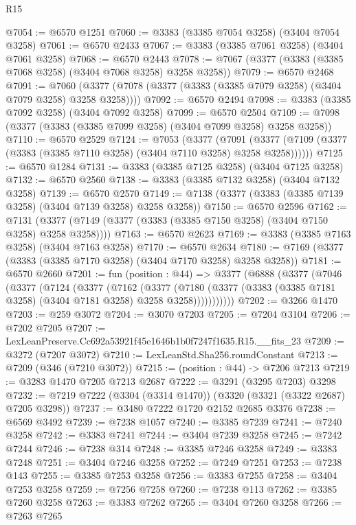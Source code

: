 \begin{lexlean}{R15}
\begin{coremodule}
@7054 := @6570 @1251
@7060 := @3383 (@3385 @7054 @3258) (@3404 @7054 @3258)
@7061 := @6570 @2433
@7067 := @3383 (@3385 @7061 @3258) (@3404 @7061 @3258)
@7068 := @6570 @2443
@7078 := @7067 (@3377 (@3383 (@3385 @7068 @3258) (@3404 @7068 @3258) @3258 @3258))
@7079 := @6570 @2468
@7091 := @7060 (@3377 (@7078 (@3377 (@3383 (@3385 @7079 @3258) (@3404 @7079 @3258) @3258 @3258))))
@7092 := @6570 @2494
@7098 := @3383 (@3385 @7092 @3258) (@3404 @7092 @3258)
@7099 := @6570 @2504
@7109 := @7098 (@3377 (@3383 (@3385 @7099 @3258) (@3404 @7099 @3258) @3258 @3258))
@7110 := @6570 @2529
@7124 := @7053
    (@3377
      (@7091 (@3377 (@7109 (@3377 (@3383 (@3385 @7110 @3258) (@3404 @7110 @3258) @3258 @3258))))))
@7125 := @6570 @1284
@7131 := @3383 (@3385 @7125 @3258) (@3404 @7125 @3258)
@7132 := @6570 @2560
@7138 := @3383 (@3385 @7132 @3258) (@3404 @7132 @3258)
@7139 := @6570 @2570
@7149 := @7138 (@3377 (@3383 (@3385 @7139 @3258) (@3404 @7139 @3258) @3258 @3258))
@7150 := @6570 @2596
@7162 := @7131 (@3377 (@7149 (@3377 (@3383 (@3385 @7150 @3258) (@3404 @7150 @3258) @3258 @3258))))
@7163 := @6570 @2623
@7169 := @3383 (@3385 @7163 @3258) (@3404 @7163 @3258)
@7170 := @6570 @2634
@7180 := @7169 (@3377 (@3383 (@3385 @7170 @3258) (@3404 @7170 @3258) @3258 @3258))
@7181 := @6570 @2660
@7201 := fun (position : @44) =>
  @3377
    (@6888
      (@3377
        (@7046
          (@3377
            (@7124
              (@3377
                (@7162
                  (@3377
                    (@7180
                      (@3377 (@3383 (@3385 @7181 @3258) (@3404 @7181 @3258) @3258 @3258)))))))))))
@7202 := @3266 @1470
@7203 := @259 @3072
@7204 := @3070 @7203
@7205 := @7204 @3104
@7206 := @7202 @7205
@7207 := LexLeanPreserve.Cc692a53921f45e1646b1b0f7247f1635.R15.__fits_23
@7209 := @3272 (@7207 @3072)
@7210 := LexLeanStd.Sha256.roundConstant
@7213 := @7209 (@346 (@7210 @3072))
@7215 := (position : @44) -> @7206 @7213
@7219 := @3283 @1470 @7205 @7213 @2687
@7222 := @3291 (@3295 @7203) @3298
@7232 := @7219 @7222 (@3304 (@3314 @1470)) (@3320 (@3321 (@3322 @2687) @7205 @3298))
@7237 := @3480 @7222 @1720 @2152 @2685 @3376
@7238 := @6569 @3492
@7239 := @7238 @1057
@7240 := @3385 @7239
@7241 := @7240 @3258
@7242 := @3383 @7241
@7244 := @3404 @7239 @3258
@7245 := @7242 @7244
@7246 := @7238 @314
@7248 := @3385 @7246 @3258
@7249 := @3383 @7248
@7251 := @3404 @7246 @3258
@7252 := @7249 @7251
@7253 := @7238 @143
@7255 := @3385 @7253 @3258
@7256 := @3383 @7255
@7258 := @3404 @7253 @3258
@7259 := @7256 @7258
@7260 := @7238 @113
@7262 := @3385 @7260 @3258
@7263 := @3383 @7262
@7265 := @3404 @7260 @3258
@7266 := @7263 @7265

\end{coremodule}
\end{lexlean}
